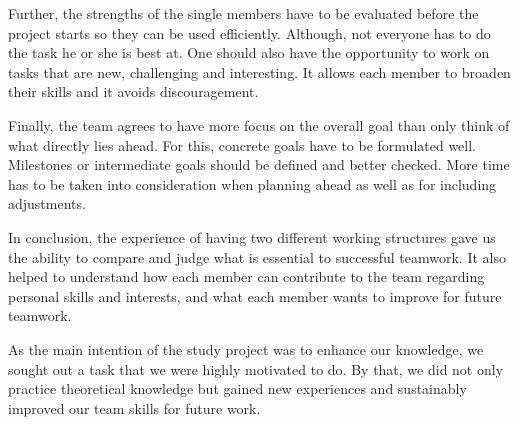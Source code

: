 Further, the strengths of the single members have to be evaluated before the project starts so they can be used efficiently. Although, not everyone has to do the task he or she is best at. One should also have the opportunity to work on tasks that are new, challenging and interesting. It allows each member to broaden their skills and it avoids discouragement. 

Finally, the team agrees to have more focus on the overall goal than only think of what directly lies ahead. For this, concrete goals have to be formulated well. Milestones or intermediate goals should be defined and better checked. More time has to be taken into consideration when planning ahead as well as for including adjustments.

\bigskip
In conclusion, the experience of having two different working structures gave us the ability to compare and judge what is essential to successful teamwork. It also helped to understand how each member can contribute to the team regarding personal skills and interests, and what each member wants to improve for future teamwork.

As the main intention of the study project was to enhance our knowledge, we sought out a task that we were highly motivated to do. By that, we did not only practice theoretical knowledge but gained new experiences and sustainably improved our team skills for future work.